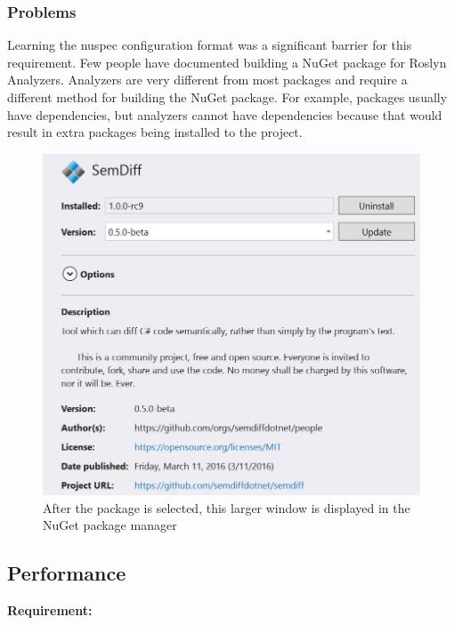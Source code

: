 \documentclass[draftclsnofoot,onecolumn]{IEEEtran}
\begin{document}
\subsubsection{Problems}

Learning the nuspec configuration format was a significant barrier for this requirement. Few people have documented building a NuGet package for Roslyn Analyzers. Analyzers are very different from most packages and require a different method for building the NuGet package. For example, packages usually have dependencies, but analyzers cannot have dependencies because that would result in extra packages being installed to the project.

\begin{figure}[t]
\centering
\includegraphics[scale=.4]{SemDiffInPackageManager}
\caption{After the package is selected, this larger window is displayed in the NuGet package manager}
\label{pacman}
\end{figure}

\subsection{Performance}%

\textbf{Requirement:}
\end{document}
